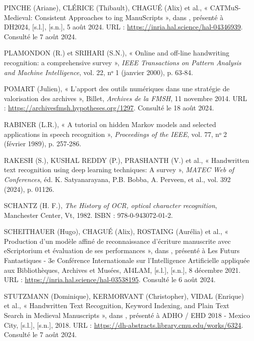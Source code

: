 \documentclass[a4paper,12pt,twoside]{book}
\begin{document}
\begin{thebibliography}{99}
		 \textsc{PINCHE} (Ariane), \textsc{CLÉRICE} (Thibault), \textsc{CHAGUÉ} (Alix) et al., « CATMuS-Medieval: Consistent Approaches to ing ManuScripts », dans , présenté à DH2024, [s.l.], [s.n.], 5 août 2024. URL : \url{https://inria.hal.science/hal-04346939}. Consulté le 7 août 2024.
		
		 \textsc{PLAMONDON} (R.) et \textsc{SRIHARI} (S.N.), « Online and off-line handwriting recognition: a comprehensive survey », \emph{IEEE Transactions on Pattern Analysis and Machine Intelligence}, vol. 22, nᵒ 1 (janvier 2000), p. 63‑84.
		
		 \textsc{POMART} (Julien), « L’apport des outils numériques dans une stratégie de valorisation des archives », Billet, \emph{Archives de la FMSH}, 11 novembre 2014. URL : \url{https://archivesfmsh.hypotheses.org/1297}. Consulté le 18 août 2024.
		
		 \textsc{RABINER} (L.R.), « A tutorial on hidden Markov models and selected applications in speech recognition », \emph{Proceedings of the IEEE}, vol. 77, nᵒ 2 (février 1989), p. 257‑286.
		
		 \textsc{RAKESH} (S.), \textsc{KUSHAL REDDY} (P.), \textsc{PRASHANTH} (V.) et al., « Handwritten text recognition using deep learning techniques: A survey », \emph{MATEC Web of Conferences}, éd. K. Satyanarayana, P.B. Bobba, A. Perveen, et al., vol. 392 (2024), p. 01126.
		
		 \textsc{SCHANTZ} (H. F.), \emph{The History of OCR, optical character recognition}, Manchester Center, Vt, 1982. ISBN : 978-0-943072-01-2.
		
		 \textsc{SCHEITHAUER} (Hugo), \textsc{CHAGUÉ} (Alix), \textsc{ROSTAING} (Aurélia) et al., « Production d’un modèle affiné de reconnaissance d’écriture manuscrite avec eScriptorium et évaluation de ses performances », dans , présenté à Les Futurs Fantastiques - 3e Conférence Internationale sur l’Intelligence Artificielle appliquée aux Bibliothèques, Archives et Musées, AI4LAM, [s.l.], [s.n.], 8 décembre 2021. URL : \url{https://inria.hal.science/hal-03538195}. Consulté le 6 août 2024.
		
		 \textsc{STUTZMANN} (Dominique), \textsc{KERMORVANT} (Christopher), \textsc{VIDAL} (Enrique) et al., « Handwritten Text Recognition, Keyword Indexing, and Plain Text Search in Medieval Manuscripts », dans , présenté à ADHO / EHD 2018 - Mexico City, [s.l.], [s.n.], 2018. URL : \url{https://dh-abstracts.library.cmu.edu/works/6324}. Consulté le 7 août 2024.
		

\end{thebibliography}
\end{document}
